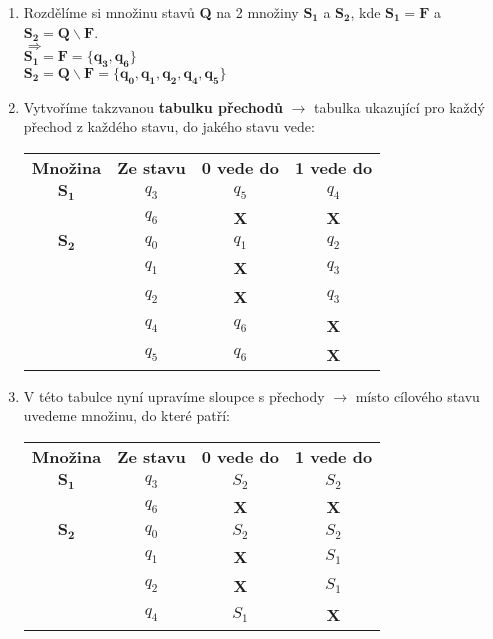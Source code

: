 \documentclass{report}
\begin{document}
\begin{enumerate}
  \item Rozdělíme si množinu stavů \textbf{Q} na 2 množiny $\mathbf{S_1}$ a $\mathbf{S_2}$, kde $\mathbf{S_1=F}$ a $\mathbf{S_2=Q\backslash F}$.
  \\
  $\Rightarrow$\\ $\mathbf{S_1=F=\{q_3,q_6\}}$ \\ $\mathbf{S_2=Q\backslash F=\{q_0,q_1,q_2,q_4,q_5\}}$ 
  \item Vytvoříme takzvanou \textbf{tabulku přechodů} $\rightarrow$ tabulka ukazující pro každý přechod z každého stavu, do jakého stavu vede:\\
 \begin{center}
  \begin{tabular}{c|c|c|c}
       \textbf{Množina} & \textbf{Ze stavu} & \textbf{0 vede do} & \textbf{1 vede do} \\
       $\mathbf{S_1}$ & $q_3$ & $q_5$ & $q_4$ \\
       & $q_6$ & \textbf{X} & \textbf{X} \\ \hline
       $\mathbf{S_2}$ & $q_0$ & $q_1$ & $q_2$ \\
       & $q_1$ & \textbf{X} & $q_3$ \\
       & $q_2$ & \textbf{X} & $q_3$ \\
       & $q_4$ & $q_6$ & \textbf{X} \\
       & $q_5$ & $q_6$ & \textbf{X} \\
  \end{tabular}
  \end{center}
  \item V této tabulce nyní upravíme sloupce s přechody $\rightarrow$ místo cílového stavu uvedeme množinu, do které patří:\\
  \begin{center}
  \begin{tabular}{c|c|c|c}
       \textbf{Množina} & \textbf{Ze stavu} & \textbf{0 vede do} & \textbf{1 vede do} \\
       $\mathbf{S_1}$ & $q_3$ & $S_2$ & $S_2$ \\
       & $q_6$ & \textbf{X} & \textbf{X} \\ \hline
       $\mathbf{S_2}$& $q_0$ & $S_2$ & $S_2$ \\
       & $q_1$ & \textbf{X} & $S_1$ \\
       & $q_2$ & \textbf{X} & $S_1$ \\
       & $q_4$ & $S_1$ & \textbf{X} \\

\end{tabular}
\end{center}
\end{enumerate}
\end{document}
